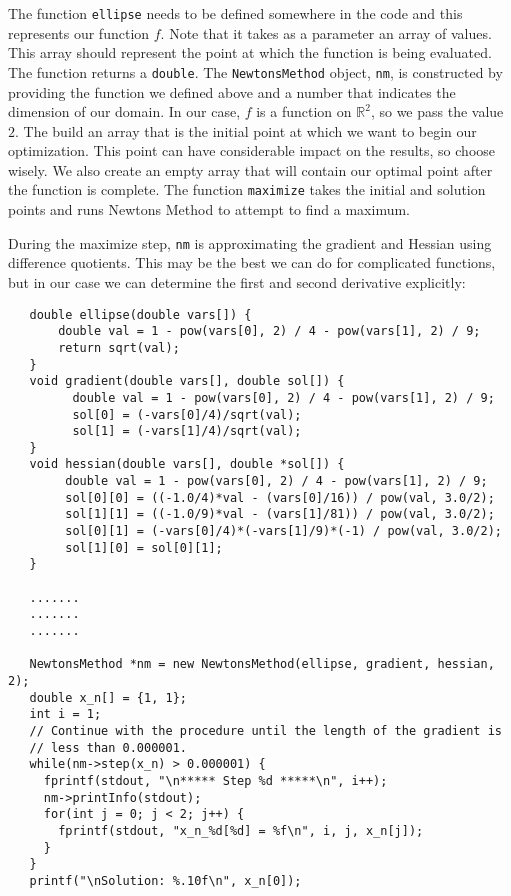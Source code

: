 \documentclass{amsart}
\theoremstyle{plain}
\numberwithin{equation}{section}
\begin{document}
The function \verb|ellipse| needs to be defined somewhere in the code and this represents our function $f$. Note that it takes as a parameter an array of values. This array should represent the point at which the function is being evaluated. The function returns a \texttt{double}. The \verb|NewtonsMethod| object, \verb|nm|, is constructed by providing the function we defined above and a number that indicates the dimension of our domain. In our case, $f$ is a function on $\mathbb{R}^2$, so we pass the value $2$. The build an array that is the initial point at which we want to begin our optimization. This point can have considerable impact on the results, so choose wisely. We also create an empty array that will contain our optimal point after the function is complete. The function \verb|maximize| takes the initial and solution points and runs Newtons Method to attempt to find a maximum. \newline

During the maximize step, \verb|nm| is approximating the gradient and Hessian using difference quotients. This may be the best we can do for complicated functions, but in our case we can determine the first and second derivative explicitly: \newline

\begin{verbatim}
   double ellipse(double vars[]) {
       double val = 1 - pow(vars[0], 2) / 4 - pow(vars[1], 2) / 9;
       return sqrt(val);
   }
   void gradient(double vars[], double sol[]) {
   		 double val = 1 - pow(vars[0], 2) / 4 - pow(vars[1], 2) / 9;
   		 sol[0] = (-vars[0]/4)/sqrt(val);
   		 sol[1] = (-vars[1]/4)/sqrt(val);
   }
   void hessian(double vars[], double *sol[]) {
   		double val = 1 - pow(vars[0], 2) / 4 - pow(vars[1], 2) / 9;
   		sol[0][0] = ((-1.0/4)*val - (vars[0]/16)) / pow(val, 3.0/2);
   		sol[1][1] = ((-1.0/9)*val - (vars[1]/81)) / pow(val, 3.0/2);
   		sol[0][1] = (-vars[0]/4)*(-vars[1]/9)*(-1) / pow(val, 3.0/2);
   		sol[1][0] = sol[0][1];
   }

   .......
   .......
   .......
	 
   NewtonsMethod *nm = new NewtonsMethod(ellipse, gradient, hessian, 2);
   double x_n[] = {1, 1};
   int i = 1;
   // Continue with the procedure until the length of the gradient is 
   // less than 0.000001.
   while(nm->step(x_n) > 0.000001) {
     fprintf(stdout, "\n***** Step %d *****\n", i++);
     nm->printInfo(stdout);
     for(int j = 0; j < 2; j++) {
       fprintf(stdout, "x_n_%d[%d] = %f\n", i, j, x_n[j]);
     }
   }
   printf("\nSolution: %.10f\n", x_n[0]);
\end{verbatim}
\end{document}
